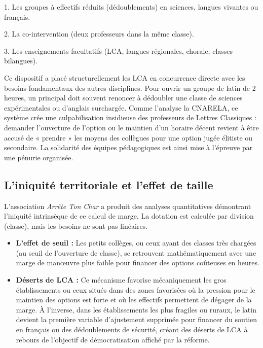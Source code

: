 1. Les groupes à effectifs réduits (dédoublements) en sciences, langues vivantes ou français.

2. La co-intervention (deux professeurs dans la même classe).

3. Les enseignements facultatifs (LCA, langues régionales, chorale, classes
bilangues).\cite{I-3-2-ref3}

Ce dispositif a placé structurellement les LCA en concurrence directe avec les besoins fondamentaux
des autres disciplines. Pour ouvrir un groupe de latin de 2 heures, un principal doit souvent
renoncer à dédoubler une classe de sciences expérimentales ou d'anglais surchargée. Comme l'analyse
la CNARELA, ce système crée une culpabilisation insidieuse des professeurs de Lettres Classiques :
demander l'ouverture de l'option ou le maintien d'un horaire décent revient à être accusé de «
prendre » les moyens des collègues pour une option jugée élitiste ou secondaire.\cite{I-3-2-ref1} La
solidarité des équipes pédagogiques est ainsi mise à l'épreuve par une pénurie organisée.



\subsection{L'iniquité territoriale et l'effet de taille}

L'association \textit{Arrête Ton Char} a produit des analyses quantitatives démontrant l'iniquité
intrinsèque de ce calcul de marge. La dotation est calculée par division (classe), mais les besoins
ne sont pas linéaires.

\begin{itemize}\item \textbf{L'effet de seuil :} Les petits collèges, ou ceux ayant des classes très chargées (au seuil de l'ouverture de classe), se retrouvent mathématiquement avec une marge de manœuvre plus faible pour financer des options coûteuses en heures.\item \textbf{Déserts de LCA :} Ce mécanisme favorise mécaniquement les gros établissements ou ceux situés dans des zones favorisées où la pression pour le maintien des options est forte et où les effectifs permettent de dégager de la marge. À l'inverse, dans les établissements les plus fragiles ou ruraux, le latin devient la première variable d'ajustement supprimée pour financer du soutien en français ou des dédoublements de sécurité, créant des déserts de LCA à rebours de l'objectif de démocratisation affiché par la réforme.\cite{I-3-2-ref5}\end{itemize}

